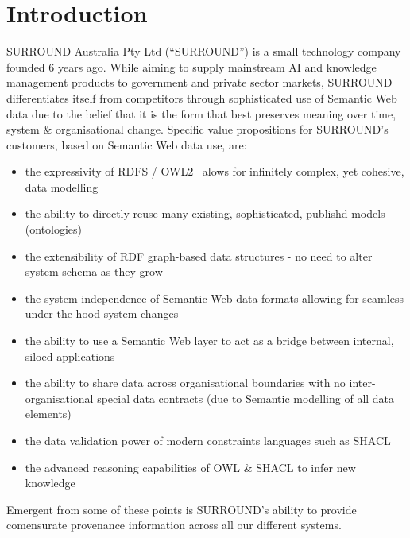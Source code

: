 \documentclass[letterpaper,twocolumn,10pt]{article}
\begin{document}
\section{Introduction}
SURROUND Australia Pty Ltd (``SURROUND'') is a small technology company founded 6 years ago. While
aiming to supply mainstream AI and knowledge management products to government and private
sector markets, SURROUND differentiates itself from competitors through sophisticated use
of Semantic Web data due to the belief that it is the form that best preserves meaning 
over time, system \& organisational change. Specific value propositions for SURROUND's customers, 
based on Semantic Web data use, are:

\begin{itemize}
  \item the expressivity of RDFS / OWL2~\cite{dan_brickley_rdf_2014,w3c_owl_working_group_owl_2012} alows for infinitely complex, yet cohesive, data modelling
  \item the ability to directly reuse many existing, sophisticated, publishd models (ontologies)
  \item the extensibility of RDF graph-based data structures - no need to alter system schema as they grow
  \item the system-independence of Semantic Web data formats allowing for seamless under-the-hood system changes
  \item the ability to use a Semantic Web layer to act as a bridge between internal, siloed applications
  \item the ability to share data across organisational boundaries with no inter-organisational special data contracts (due to Semantic modelling of all data elements)
  \item the data validation power of modern constraints languages such as SHACL~\cite{knublauch_shapes_2017}
  \item the advanced reasoning capabilities of OWL \& SHACL to infer new knowledge
\end{itemize}

Emergent from some of these points is SURROUND's ability to provide comensurate provenance information 
across all our different systems.

\end{document}

